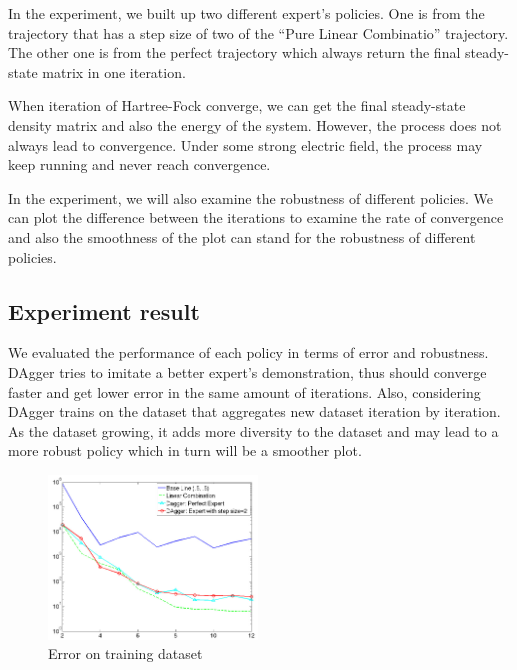 \documentclass[twoside]{article}
\begin{document}
In the experiment, we built up two different expert's policies. 
One is from the trajectory that has a step size of two of the ``Pure Linear Combinatio'' trajectory. The other one is from the perfect trajectory which always return the final steady-state matrix in one iteration.


When iteration of Hartree-Fock converge, we can get the final steady-state density matrix and also the energy of the system. However, the process does not always lead to convergence. Under some strong electric field, the process may keep running and never reach convergence.

In the experiment, we will also examine the robustness of different policies.
We can plot the difference between the iterations to examine the rate of convergence and also the smoothness of the plot can stand for the robustness of different policies.





 


\subsection{Experiment result}


We evaluated the performance of each policy in terms of error and robustness. 
DAgger tries to imitate a better expert's demonstration, thus should converge faster and get lower error in the same amount of iterations. Also, considering DAgger trains on the dataset that aggregates new dataset iteration by iteration. As the dataset growing, it adds more diversity to the dataset and may lead to a more robust policy which in turn will be a smoother plot.


\begin{figure}[h!]
  \caption{Error on training dataset}
	\label{fig:training}
    \includegraphics[width=210px]{Dagger_beta05_training.jpg}
\end{figure}
\end{document}
